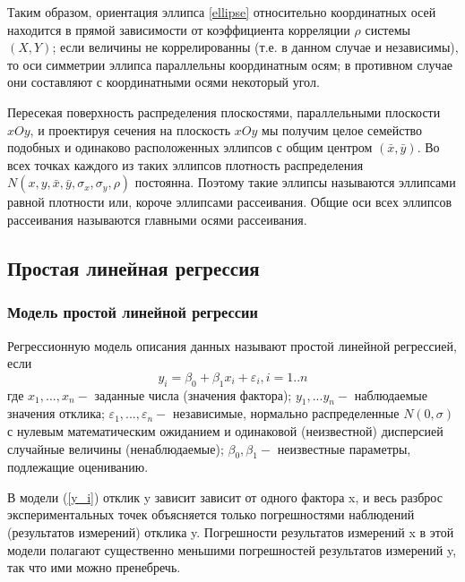 \documentclass[12pt]{article}
\begin{document}
	Таким образом, ориентация эллипса \ref{ellipse} относительно координатных осей находится в прямой зависимости от коэффициента корреляции $\rho$ системы $(X,Y)$; если величины не коррелированны (т.е. в данном случае и независимы), то оси симметрии эллипса параллельны координатным осям; в противном случае они составляют с координатными осями некоторый угол.

	Пересекая поверхность распределения плоскостями, параллельными плоскости $xOy$, и проектируя сечения на плоскость $xOy$ мы получим целое семейство подобных и одинаково расположенных эллипсов с общим центром $(\bar{x},\bar{y})$. Во всех точках каждого из таких эллипсов плотность распределения $ N(x, y, \bar{x}, \bar{y}, \sigma_{x}, \sigma_{y}, \rho)$ постоянна. Поэтому такие эллипсы называются эллипсами равной плотности или, короче эллипсами рассеивания. Общие оси всех эллипсов рассеивания называются главными осями рассеивания.
	
	\subsection{Простая линейная регрессия}
	\subsubsection{Модель простой линейной регрессии}
	 Регрессионную модель описания данных называют простой линейной регрессией, если
	\begin{equation}
		y_{i} = \beta_{0} + \beta_{1}x_{i} + \varepsilon_{i},  i = 1..n
		\label{y_i}
	\end{equation}
	где $x_1,...,x_n - $ заданные числа (значения фактора);
	$y_1,...y_n - $ наблюдаемые значения отклика;
	$\varepsilon_1,...,\varepsilon_n - $ независимые, нормально распределенные $N(0, \sigma)$ с нулевым математическим ожиданием и одинаковой (неизвестной) дисперсией случайные величины (ненаблюдаемые);
	$\beta_0, \beta_1 - $ неизвестные параметры, подлежащие оцениванию.
	
	В модели (\ref{y_i}) отклик y зависит зависит от одного фактора x, и весь разброс экспериментальных точек объясняется только погрешностями наблюдений (результатов измерений) отклика y. Погрешности результатов измерений x в этой модели полагают существенно меньшими погрешностей результатов измерений y, так что ими можно пренебречь.
	
\end{document}
